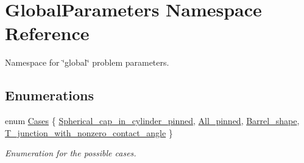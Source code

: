 \hypertarget{namespaceGlobalParameters}{}\section{Global\+Parameters Namespace Reference}
\label{namespaceGlobalParameters}


Namespace for \char`\"{}global\char`\"{} problem parameters.  


\subsection*{Enumerations}
\begin{DoxyCompactItemize}
\item 
enum \hyperlink{namespaceGlobalParameters_adde04e4243b82e3d4bd2f82d37a2d6bf}{Cases} \{ \hyperlink{namespaceGlobalParameters_adde04e4243b82e3d4bd2f82d37a2d6bfac08080f634c714da38f1122301eafda7}{Spherical\+\_\+cap\+\_\+in\+\_\+cylinder\+\_\+pinned}, 
\hyperlink{namespaceGlobalParameters_adde04e4243b82e3d4bd2f82d37a2d6bfa28147edc9cfc06038f2a7deaf8890558}{All\+\_\+pinned}, 
\hyperlink{namespaceGlobalParameters_adde04e4243b82e3d4bd2f82d37a2d6bfa1e6d2261f2fa0541d57b5a0a8c044ddc}{Barrel\+\_\+shape}, 
\hyperlink{namespaceGlobalParameters_adde04e4243b82e3d4bd2f82d37a2d6bfa89cfbba408c0774e0b9024baa187dfb8}{T\+\_\+junction\+\_\+with\+\_\+nonzero\+\_\+contact\+\_\+angle}
 \}\begin{DoxyCompactList}\small\item\em Enumeration for the possible cases. \end{DoxyCompactList}
\end{DoxyCompactItemize}
